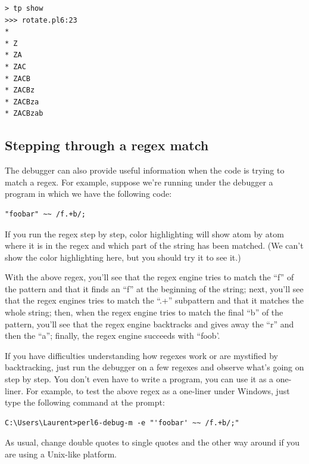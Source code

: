 \begin{verbatim}
> tp show
>>> rotate.pl6:23
*
* Z
* ZA
* ZAC
* ZACB
* ZACBz
* ZACBza
* ZACBzab
\end{verbatim}

\subsection{Stepping through a regex match}
\label{regex-debugging}

The debugger can also provide useful information when the 
code is trying to match a regex. For example, suppose we're 
running under the debugger a program in which we have the 
following code:

\begin{verbatim}
"foobar" ~~ /f.+b/;
\end{verbatim}

If you run the regex step by step, color highlighting will show 
atom by atom where it is in the regex and which part of the 
string has been matched. (We can't show the color highlighting 
here, but you should try it to see it.)

With the above regex, you'll see that 
the regex engine tries to match the ``f'' of the pattern and that 
it finds an ``f'' at the beginning of the string; next, you'll see 
that the regex engines tries to match the ``.+'' subpattern and 
that it matches the whole string; then, when the regex engine 
tries to match the final ``b'' of the pattern, you'll see that 
the regex engine backtracks and gives away the ``r'' and then the 
``a''; finally, the regex engine succeeds with ``foob'.

If you have difficulties understanding how regexes work or are 
mystified by backtracking, just run the debugger on a few 
regexes and observe what's going on step by step. You don't 
even have to write a program, you can use it as a one-liner. 
For example, to test the above regex as a one-liner under  
Windows, just type the following command at the prompt:

\begin{verbatim}
C:\Users\Laurent>perl6-debug-m -e "'foobar' ~~ /f.+b/;"
\end{verbatim}

As usual, change double quotes to single quotes and the other 
way around if you are using a Unix-like platform.


